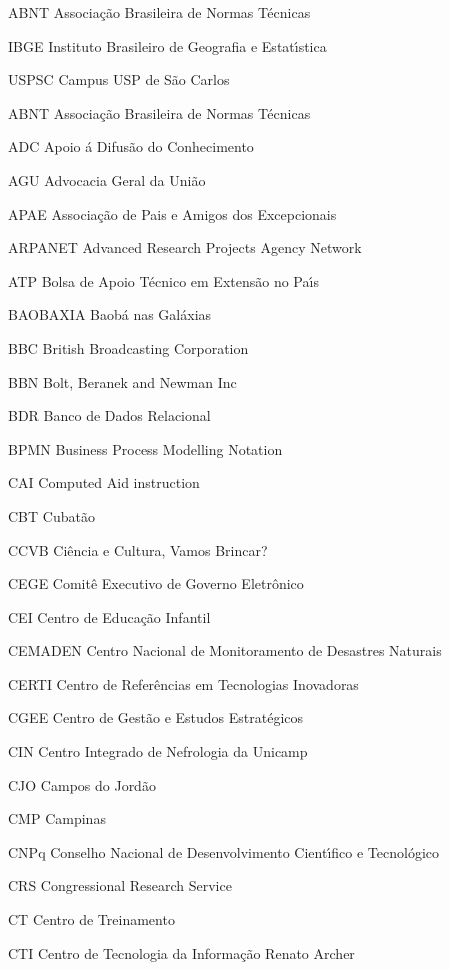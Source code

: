 \begin{siglas}
    \item[ABNT] Associa\c{c}\~ao Brasileira de Normas T\'ecnicas
	\item[IBGE] Instituto Brasileiro de Geografia e Estat\'{\i}stica
	\item[USPSC] Campus USP de S\~ao Carlos
\item[ABNT] Associa\c{c}\~ao Brasileira de Normas T\'ecnicas
\item[ADC] Apoio \'a Difus\~ao do Conhecimento
\item[AGU] Advocacia Geral da Uni\~ao
\item[APAE] Associa\c{c}\~ao de Pais e Amigos dos Excepcionais 
\item[ARPANET] Advanced Research Projects Agency Network
\item[ATP] Bolsa de Apoio T\'ecnico em Extens\~ao no Pa\'{\i}s  
\item[BAOBAXIA] Baob\'a nas Gal\'axias
\item[BBC] British Broadcasting Corporation
\item[BBN] Bolt, Beranek and Newman Inc
\item[BDR] Banco de Dados Relacional	
\item[BPMN] Business Process Modelling Notation
\item[CAI] Computed Aid instruction
\item[CBT] Cubat\~ao
\item[CCVB] Ci\^encia e Cultura, Vamos Brincar?
\item[CEGE] Comit\^e Executivo de Governo Eletr\^onico
\item[CEI] Centro de Educa\c{c}\~ao Infantil
\item[CEMADEN] Centro Nacional de Monitoramento de Desastres Naturais
\item[CERTI] Centro de Refer\^encias em Tecnologias Inovadoras
\item[CGEE] Centro de Gest\~ao e Estudos Estrat\'egicos
\item[CIN] Centro Integrado de Nefrologia da Unicamp
\item[CJO] Campos do Jord\~ao
\item[CMP] Campinas
\item[CNPq] Conselho Nacional de Desenvolvimento Cient\'{\i}fico e Tecnol\'ogico
\item[CRS] Congressional Research Service
\item[CT] Centro de Treinamento
\item[CTI] Centro de Tecnologia da Informa\c{c}\~ao Renato Archer

\end{siglas}
